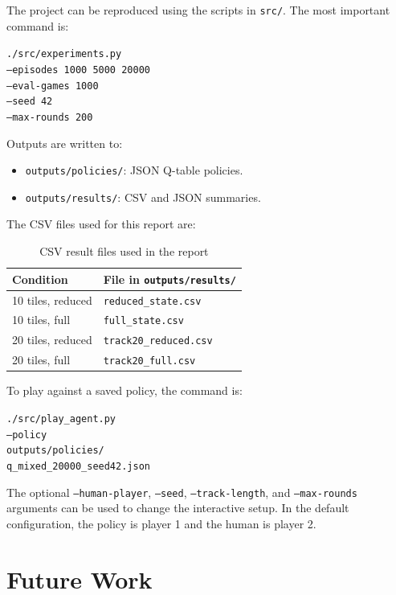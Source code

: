 \documentclass[conference]{IEEEtran}
\begin{document}
The project can be reproduced using the scripts in \texttt{src/}. The most
important command is:

\noindent\texttt{./src/experiments.py}\\
\texttt{--episodes 1000 5000 20000}\\
\texttt{--eval-games 1000}\\
\texttt{--seed 42}\\
\texttt{--max-rounds 200}

Outputs are written to:

\begin{itemize}
\item \texttt{outputs/policies/}: JSON Q-table policies.
\item \texttt{outputs/results/}: CSV and JSON summaries.
\end{itemize}

The CSV files used for this report are:

\begin{table}[h]
\centering
\caption{CSV result files used in the report}
\label{tab:csvfiles}
\begin{tabular}{ll}
\toprule
Condition & File in \texttt{outputs/results/} \\
\midrule
10 tiles, reduced & \texttt{reduced\_state.csv} \\
10 tiles, full & \texttt{full\_state.csv} \\
20 tiles, reduced & \texttt{track20\_reduced.csv} \\
20 tiles, full & \texttt{track20\_full.csv} \\
\bottomrule
\end{tabular}
\end{table}

To play against a saved policy, the command is:

\noindent\texttt{./src/play\_agent.py}\\
\texttt{--policy}\\
\texttt{outputs/policies/}\\
\texttt{q\_mixed\_20000\_seed42.json}

The optional \texttt{--human-player}, \texttt{--seed}, \texttt{--track-length}, and
\texttt{--max-rounds} arguments can be used to change the interactive setup. In
the default configuration, the policy is player 1 and the human is player 2.

\section{Future Work}
\end{document}
